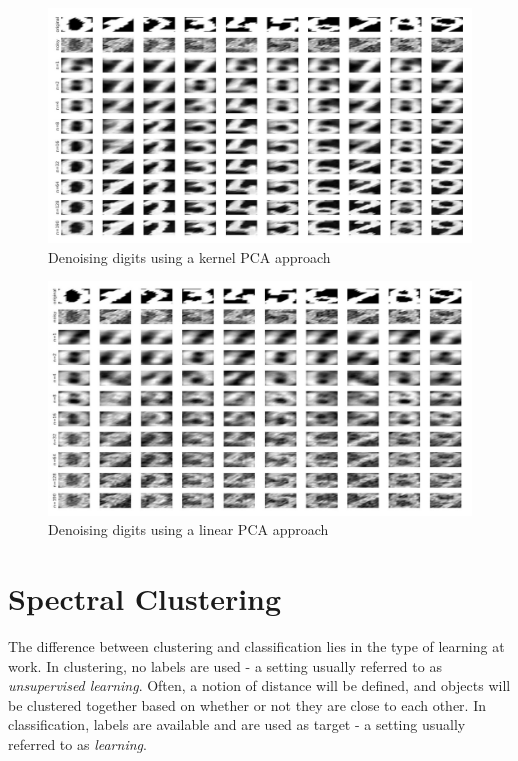 \documentclass[11pt, a4paper]{article}
\begin{document}
\begin{figure}[H]
  \centering
  \includegraphics[scale=.24]{digitsn_kernelpca.jpg}
  \caption{Denoising digits using a kernel PCA approach}
  \label{fig:digitsn_kernelpca}
\end{figure}

\begin{figure}[H]
  \centering
  \includegraphics[scale=.24]{digitsn_linearpca.jpg}
  \caption{Denoising digits using a linear PCA approach}
  \label{fig:digitsn_linearpca}
\end{figure}

\section{Spectral Clustering}

The difference between clustering and classification lies in the type
of learning at work. In clustering, no labels are used - a setting
usually referred to as \emph{unsupervised learning}. Often, a notion
of distance will be defined, and objects will be clustered together
based on whether or not they are close to each other. In
classification, labels are available and are used as target - a
setting usually referred to as \emph{learning}.
\end{document}
